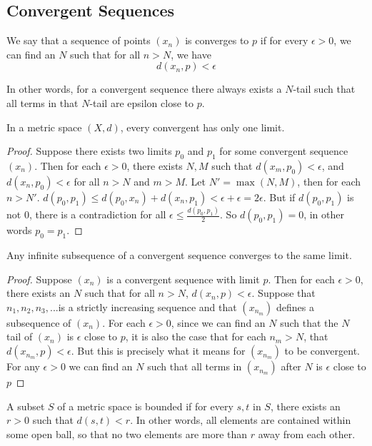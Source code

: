 \documentclass{article}
\begin{document}
\subsection{Convergent Sequences}
\begin{definition}
    We say that a sequence of points $(x_n)$ is converges to $p$ if for every $\epsilon>0$, we can
    find an $N$ such that for all $n> N$, we have 
    \[
    d(x_n,p)<\epsilon
    \]
\end{definition}
In other words, for a convergent sequence there always exists a $N$-tail such that all terms in that $N$-tail are epsilon
close to $p$.
\begin{theorem}
    In a metric space $(X,d)$, every convergent has only one limit.
\end{theorem}
\begin{proof}
    Suppose there exists two limits $p_0$ and $p_1$ for some convergent sequence $(x_n)$. Then for each $\epsilon >0$,
    there exists $N,M$ such that $d(x_m, p_0)< \epsilon$, and $d(x_n, p_0)< \epsilon$ for all $n>N$ and $m>M$. Let $N'=\max(N,M)$,
    then for each $n>N'$. $d(p_0, p_1)\leq d(p_0, x_n)+d(x_n, p_1)< \epsilon + \epsilon= 2\epsilon$. But if $d(p_0,p_1)$ is not $0$, 
    there is a contradiction for all $\epsilon \leq \frac{d(p_0,p_1)}{2}$. So $d(p_0,p_1)=0$, in other words $p_0=p_1$.
\end{proof}
\begin{theorem}
    Any infinite subsequence of a convergent sequence converges to the same limit.
\end{theorem}
\begin{proof}
    Suppose $(x_n)$ is a convergent sequence with limit $p$. Then for each $\epsilon>0$, there exists an $N$ such that for all $n>N$,
    $d(x_n,p)<\epsilon$. Suppose that $n_1,n_2,n_3,...$is a strictly increasing sequence and that $(x_{n_m})$ defines a subsequence of $(x_n)$. For each $\epsilon>0$, since we can find an $N$ such that the $N$
    tail of $(x_n)$ is $\epsilon$ close to $p$, it is also the case that for each $n_m>N$, that $d(x_{n_m}, p)<\epsilon$. But this is precisely what it means for 
    $(x_{n_m})$ to be convergent. For any $\epsilon >0$ we can find an $N$ such that all terms in $(x_{n_m})$ after $N$ is $\epsilon$ close to $p$
\end{proof}
\begin{definition}
    A subset $S$ of a metric space is bounded if for every $s,t$ in $S$, there exists an $r>0$ such that $d(s,t)<r$. In other words, all elements 
    are contained within some open ball, so that no two elements are more than $r$ away from each other.
\end{definition}
\end{document}
